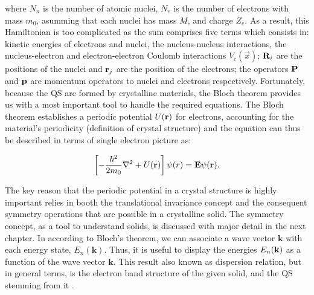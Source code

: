 where  $N_{n}$ is the number of atomic nuclei, $N_{e}$ is the number of electrons with mass $m_{0}$, asumming that each nuclei has mass $M$, and charge $Z_{e}$. As a result, this Hamiltonian is too complicated as the sum comprises five terms which consists in: kinetic energies of electrons and nuclei, the nucleus-nucleus interactions, the nucleus-electron and electron-electron Coulomb interactions $V_{c}\left(\vec{x}\right)$; $\mathrm{\bf R}_{i}$ are the positions of the nuclei and $\mathrm{\bf r}_{j}$ are the position of the electrons; the operators $\mathrm{\bf P}$ and $\mathrm{\bf p}$ are momentum operators to nuclei and electrons respectively\cite{alloul2010introduction}.
Fortunately, because  the QS are formed by crystalline materials, the Bloch theorem provides us with a most important tool to handle the required equations. The Bloch theorem establishes a periodic potential $U(\displaystyle\mathrm{\bf r})$ for electrons, accounting for the material's periodicity (definition of crystal structure) and the \sch equation can thus be described in terms of single electron picture as:  


\begin{equation}
	\left[-\dfrac{\hbar^2}{2m_{0}}\nabla^2 + U(\displaystyle\mathrm{\bf r})\right]\psi (r)=\displaystyle\mathrm{\bf E}\psi(\displaystyle\mathrm{\bf r}).
	\label{eq:chapter-1-first-sch}
\end{equation}

The key reason that the periodic potential in a crystal structure is highly important relies in booth the  translational invariance concept and the consequent symmetry operations that are possible in a crystalline solid. The symmetry concept, as a  tool to understand solids, is discussed with major detail in the next chapter. In according to Bloch's theorem, we can associate a wave vector $\boldsymbol{k}$ with each energy state, $E_{n}(\boldsymbol{k})$. Thus, it is useful to display the energies $E_{n}(\bf{k})$ as a function of the wave vector $\boldsymbol{k}$. This result also known as dispersion relation, but in general terms, is the electron band structure of the given solid, and the \gls{QS} stemming from it \cite{piprek2017handbook}.   

